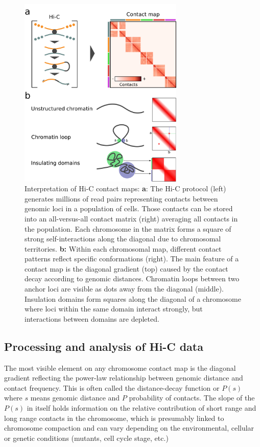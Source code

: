 \begin{figure}[htb]
    \centering
    \includegraphics[width=0.7\textwidth]{Parts/Part01/gfx/hic_interpretation.pdf}
    \caption[Interpretation of Hi-C contact maps.]{Interpretation of Hi-C contact maps: \textbf{a}: The Hi-C protocol (left) generates millions of read pairs representing contacts between genomic loci in a population of cells. Those contacts can be stored into an all-versus-all contact matrix (right) averaging all contacts in the population. Each chromosome in the matrix forms a square of strong self-interactions along the diagonal due to chromosomal territories. \textbf{b:} Within each chromosomal map, different contact patterns reflect specific conformations (right). The main feature of a contact map is the diagonal gradient (top) caused by the contact decay according to genomic distances. Chromatin loops between two anchor loci are visible as dots away from the diagonal (middle). Insulation domains form squares along the diagonal of a chromosome where loci within the same domain interact strongly, but interactions between domains are depleted.}
	\label{fig:01-02:hic}
\end{figure}



\subsection{Processing and analysis of Hi-C data}

The most visible element on any chromosome contact map is the diagonal gradient reflecting the power-law relationship between genomic distance and contact frequency. This is often called the distance-decay function or $P(s)$ where $s$ means genomic distance and $P$ probability of contacts. The slope of the $P(s)$ in itself holds information on the relative contribution of short range and long range contacts in the chromosome, which is presumably linked to chromosome compaction and can vary depending on the environmental, cellular or genetic conditions (mutants, cell cycle stage, etc.)

